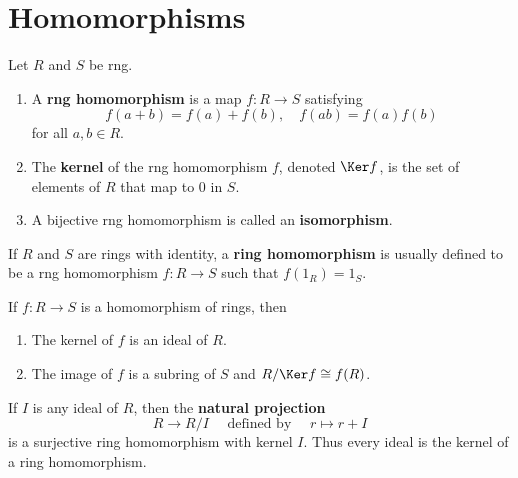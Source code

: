 \section{Homomorphisms}  %

\begin{definition}
    Let $R$ and $S$ be rng.
    \begin{enumerate}
        \item
              A \textbf{rng homomorphism} is a map $f: R \rightarrow S$ satisfying
              \begin{equation*}
                  f(a+b)=f(a)+f(b), \quad
                  f(a b)=f(a) f(b)
              \end{equation*}
              for all $a, b \in R$.
        \item
              The \textbf{kernel} of the rng homomorphism $f$, denoted $\Ker f$, is the set of elements of $R$ that map to $0$ in $S$.

        \item
              A bijective rng homomorphism is called an \textbf{isomorphism}.
    \end{enumerate}
    \begin{remark}
        If $R$ and $S$ are rings with identity, a \textbf{ring homomorphism} is usually defined to be a rng homomorphism $f: R \rightarrow S$ such that $f\left(1_R\right)=1_S$.
    \end{remark}
\end{definition}


\begin{theorem}
    If $f: R \rightarrow S$ is a homomorphism of rings, then
    \begin{enumerate}
        \item
              The kernel of $f$ is an ideal of $R$.

        \item
              The image of $f$ is a subring of $S$ and $R / \Ker f\cong f(R)$.
    \end{enumerate}
\end{theorem}

\begin{corollary}
    If $I$ is any ideal of $R$, then the \textbf{natural projection}
    \begin{equation*}
        R \rightarrow R / I \quad \text { defined by } \quad r \mapsto r+I
    \end{equation*}
    is a surjective ring homomorphism with kernel $I$. Thus every ideal is the kernel of a ring homomorphism.
\end{corollary}


